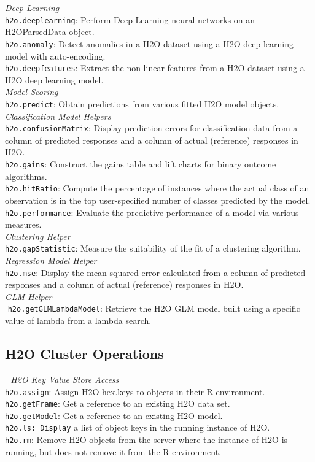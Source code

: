 \documentclass[11pt]{article}
\begin{document}
{\emph{Deep Learning}\\
{\texttt{h2o.deeplearning}}: Perform Deep Learning neural networks on an H2OParsedData object.\\
{\texttt{h2o.anomaly}}: Detect anomalies in a H2O dataset using a H2O deep learning model with auto-encoding.\\
{\texttt{h2o.deepfeatures}}: Extract the non-linear features from a H2O dataset using a H2O deep learning model.\\

\emph{Model Scoring}\\
{\texttt{h2o.predict}}: Obtain predictions from various fitted H2O model objects.\\

\emph{Classification Model Helpers}\\
{\texttt{h2o.confusionMatrix}}: Display prediction errors for classification data from a column of predicted responses and a column of actual (reference) responses in H2O.\\
{\texttt{h2o.gains}}: Construct the gains table and lift charts for binary outcome algorithms.\\
{\texttt{h2o.hitRatio}}: Compute the percentage of instances where the actual class of an observation is in the top user-specified number of classes predicted by the model.\\
{\texttt{h2o.performance}}: Evaluate the predictive performance of a model via various measures.\\

{\emph{Clustering Helper}}\\
{\texttt{h2o.gapStatistic}}: Measure the suitability of the fit of a clustering algorithm. \\

\emph{Regression Model Helper}\\
{\texttt{h2o.mse}}: Display the mean squared error calculated from a column of predicted responses and a column of actual (reference) responses in H2O.\\

\emph{GLM Helper}\\
 {\texttt{h2o.getGLMLambdaModel}}: Retrieve the H2O GLM model built using a specific value of lambda from a lambda search.\\

\subsection{H2O Cluster Operations} 
\emph{H2O Key Value Store Access}\\
{\texttt{h2o.assign}}: Assign H2O hex.keys to objects in their R environment.\\
{\texttt{h2o.getFrame}}: Get a reference to an existing H2O data set. \\
{\texttt{h2o.getModel}}: Get a reference to an existing H2O model. \\
{\texttt{h2o.ls: Display}} a list of object keys in the running instance of H2O. \\
{\texttt{h2o.rm}}: Remove H2O objects from the server where the instance of H2O is running, but does not remove it from the R environment.\\

}
\end{document}
